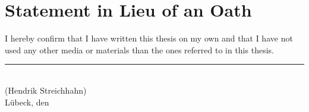 
\cleardoublepage
\thispagestyle{plain}
\vspace*{\fill}

\section*{Statement in Lieu of an Oath}

I hereby confirm that I have written this thesis on my own and that I have not used any
other media or materials than the ones referred to in this thesis.

\vskip2cm

\rule{5cm}{0.4pt}\\
(Hendrik Streichhahn)\\
Lübeck, den \duedate